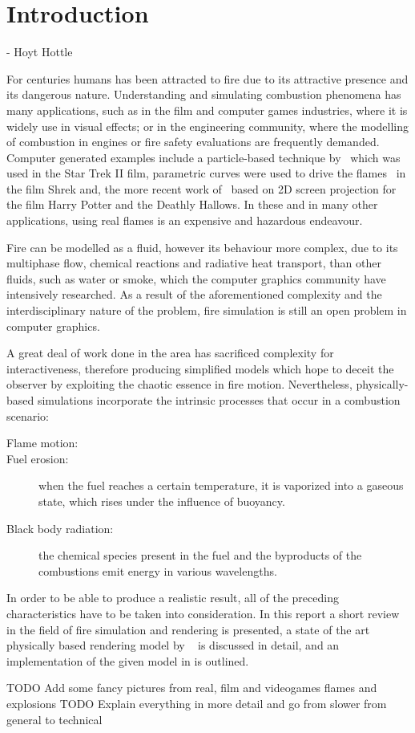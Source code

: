 \chapter{Introduction}
\label{ch:introduction}
 - Hoyt Hottle

For centuries humans has been attracted to fire due to its attractive presence and its dangerous nature.
Understanding and simulating combustion phenomena has many applications, such as in the film and computer games industries, where it is widely use in visual effects; or in the engineering community, where the modelling of combustion in engines or fire safety evaluations are frequently demanded.
Computer generated examples include a particle-based technique by~\cite{Reeves:1983} which was used in the Star Trek II film, parametric curves were used to drive the flames~\cite{Lamorlette:2002} in the film Shrek and, the more recent work of~\cite{Horvath:2009} based on 2D screen projection for the film Harry Potter and the Deathly Hallows.
In these and in many other applications, using real flames is an expensive and hazardous endeavour.

Fire can be modelled as a fluid, however its behaviour more complex, due to its multiphase flow, chemical reactions and radiative heat transport, than other fluids, such as water or smoke, which the computer graphics community have intensively researched.
As a result of the aforementioned complexity and the interdisciplinary nature of the problem, fire simulation is still an open problem in computer graphics.

A great deal of work done in the area has sacrificed complexity for interactiveness, therefore producing simplified models which hope to deceit the observer by exploiting the chaotic essence in fire motion.
Nevertheless, physically-based simulations incorporate the intrinsic processes that occur in a combustion scenario:

\begin{description}
\item[Flame motion:]
\item[Fuel erosion:] when the fuel reaches a certain temperature, it is vaporized into a gaseous state, which rises under the influence of buoyancy.
\item[Black body radiation:] the chemical species present in the fuel and the byproducts of the combustions emit energy in various wavelengths.
\end{description}

In order to be able to produce a realistic result, all of the preceding characteristics have to be taken into consideration.
In this report a short review in the field of fire simulation and rendering is presented, a state of the art physically based rendering model by ~\cite{Pegoraro:2006} is discussed in detail, and an implementation of the given model in \Maya is outlined.

TODO Add some fancy pictures from real, film and videogames flames and explosions
TODO Explain everything in more detail and go from slower from general to technical